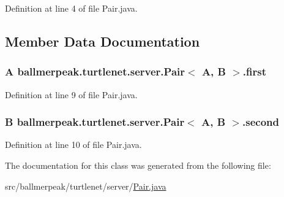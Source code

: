 Definition at line 4 of file Pair.\-java.



\subsection{Member Data Documentation}
\hypertarget{classballmerpeak_1_1turtlenet_1_1server_1_1Pair_3_01A_00_01B_01_4_a4e253f84c02d872c0a10e5f07af419ea}{
\subsubsection[{first}]{\setlength{\rightskip}{0pt plus 5cm}A ballmerpeak.\-turtlenet.\-server.\-Pair$<$ A, B $>$.first}}\label{classballmerpeak_1_1turtlenet_1_1server_1_1Pair_3_01A_00_01B_01_4_a4e253f84c02d872c0a10e5f07af419ea}


Definition at line 9 of file Pair.\-java.

\hypertarget{classballmerpeak_1_1turtlenet_1_1server_1_1Pair_3_01A_00_01B_01_4_ac5d0c46e2e78cb5aa67fe6e3d1ee2add}{
\subsubsection[{second}]{\setlength{\rightskip}{0pt plus 5cm}B ballmerpeak.\-turtlenet.\-server.\-Pair$<$ A, B $>$.second}}\label{classballmerpeak_1_1turtlenet_1_1server_1_1Pair_3_01A_00_01B_01_4_ac5d0c46e2e78cb5aa67fe6e3d1ee2add}


Definition at line 10 of file Pair.\-java.



The documentation for this class was generated from the following file\-:\begin{DoxyCompactItemize}
\item 
src/ballmerpeak/turtlenet/server/\hyperlink{Pair_8java}{Pair.\-java}\end{DoxyCompactItemize}
